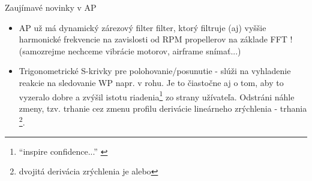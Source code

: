 \begin{frame}{Zaujímavé novinky v AP}
\begin{itemize}
  \item<1-> AP už má dynamický zárezový filter  filter, ktorý filtruje (aj) vyššie harmonické frekvencie na zavislosti od RPM propellerov na základe FFT \citep{Hall2020}! (samozrejme nechceme vibrácie motorov, airframe snímať...)
      \item<2-> Trigonometrické S-krivky  pre polohovanie/posunutie - slúži na vyhladenie reakcie na sledovanie WP napr. v rohu. Je to čiastočne aj o tom, aby to vyzeralo dobre a zvýšil istotu riadenia\footnote{``inspire confidence...'' \citep{Hall2020}} zo strany užívateľa. Odstráni náhle zmeny, tzv. trhanie  cez zmenu profilu derivácie lineárneho zrýchlenia - trhania \footnote{dvojitá derivácia zrýchlenia je  alebo }.
\end{itemize}
\end{frame}







